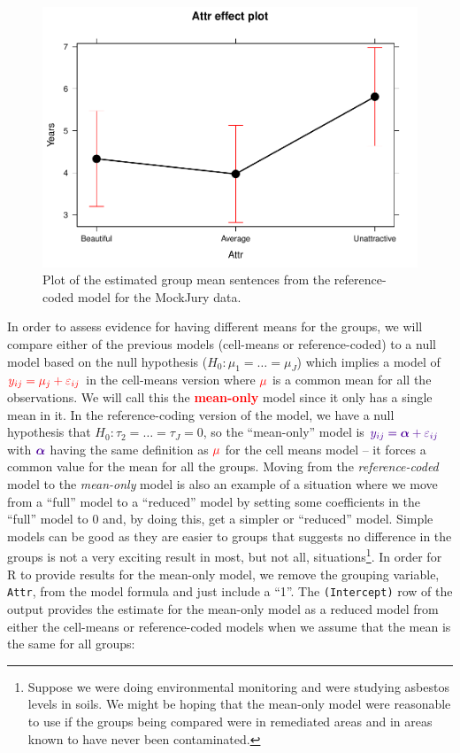 \documentclass[]{book}
\let\rmarkdownfootnote\footnote%
\def\footnote{\protect\rmarkdownfootnote}
\theoremstyle{definition}
\theoremstyle{definition}
\theoremstyle{remark}
\begin{document}
\begin{figure}
\centering
\includegraphics{03-oneWayAnova_files/figure-latex/Figure3-2-1.pdf}
\caption{\label{fig:Figure3-2}Plot of the estimated group mean sentences from the
reference-coded model for the MockJury data.}
\end{figure}

In order to assess evidence for having different means for the groups,
we will compare either of the previous models (cell-means or
reference-coded) to a null model based on the null hypothesis
(\(H_0: \mu_1 = \ldots = \mu_J\)) which implies a model of
\(\color{red}{y_{ij} = \mu_j}+\varepsilon_{ij}\) in the cell-means
version where \({\color{red}{\mu}}\) is a common mean for all the
observations. We will call this the \textcolor{red}{\textbf{mean-only}}
model since it only has a single mean in it. In the reference-coding
version of the model, we have a null hypothesis that
\(H_0: \tau_2 = \ldots = \tau_J = 0\), so the ``mean-only'' model is
\(\color{purple}{y_{ij} =\boldsymbol{\alpha}+\varepsilon_{ij}}\) with
\(\color{purple}{\boldsymbol{\alpha}}\) having the same definition as
\(\color{red}{\mu}\) for the cell means model -- it forces a common
value for the mean for all the groups. Moving from the
\emph{reference-coded} model to the \emph{mean-only} model is also an
example of a situation where we move from a ``full'' model to a
``reduced'' model by setting some coefficients in the ``full'' model to
0 and, by doing this, get a simpler or ``reduced'' model. Simple models
can be good as they are easier to groups that suggests no difference in
the groups is not a very exciting result in most, but not all,
situations\footnote{Suppose we were doing environmental monitoring and
  were studying asbestos levels in soils. We might be hoping that the
  mean-only model were reasonable to use if the groups being compared
  were in remediated areas and in areas known to have never been
  contaminated.}. In order for R to provide results for the mean-only
model, we remove the grouping variable, \texttt{Attr}, from the model
formula and just include a ``1''. The \texttt{(Intercept)} row of the
output provides the estimate for the mean-only model as a reduced model
from either the cell-means or reference-coded models when we assume that
the mean is the same for all groups:
\end{document}
